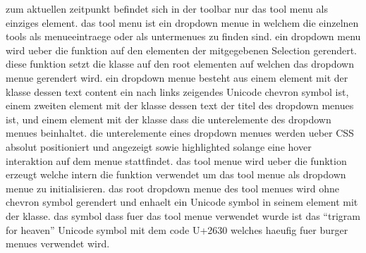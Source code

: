 zum aktuellen zeitpunkt befindet sich in der toolbar nur das tool menu als einziges element.
das tool menu ist ein dropdown menue in welchem die einzelnen tools als menueeintraege oder als untermenues zu finden sind.
ein dropdown menu wird ueber die  funktion auf den elementen der mitgegebenen Selection gerendert.
diese funktion setzt die  klasse auf den root elementen auf welchen das dropdown menue gerendert wird.
ein dropdown menue besteht aus einem  element mit der  klasse dessen text content ein nach links zeigendes Unicode chevron symbol ist, einem zweiten  element mit der  klasse dessen text der titel des dropdown menues ist, und einem  element mit der  klasse dass die unterelemente des dropdown menues beinhaltet.
die unterelemente eines dropdown menues werden ueber CSS absolut positioniert und angezeigt sowie highlighted solange eine hover interaktion auf dem menue stattfindet.
das tool menue wird ueber die  funktion erzeugt welche intern die  funktion verwendet um das tool menue als dropdown menue zu initialisieren.
das root dropdown menue des tool menues wird ohne chevron symbol gerendert und enhaelt ein Unicode symbol in seinem  element mit der  klasse. 
das symbol dass fuer das tool menue verwendet wurde ist das \enquote{trigram for heaven} Unicode symbol mit dem code U+2630 welches haeufig fuer burger menues verwendet wird.

